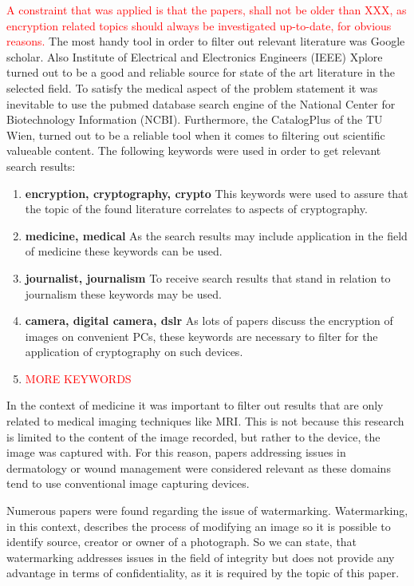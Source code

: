 \documentclass[12pt,a4paper,titlepage,oneside]{scrartcl}
\newcommand\todo[1]{\textcolor{red}{#1}}
\begin{document}
\todo{A constraint that was applied is that the papers, shall not be older than XXX, as encryption related topics should always be investigated up-to-date, for obvious reasons.}
The most handy tool in order to filter out relevant literature was Google scholar. 
Also Institute of Electrical and Electronics Engineers (IEEE) Xplore turned out to be a good and reliable source for state of the art literature in the selected field.
To satisfy the medical aspect of the problem statement it was inevitable to use the pubmed database search engine of the National Center for Biotechnology Information (NCBI).
Furthermore, the CatalogPlus of the TU Wien, turned out to be a reliable tool when it comes to filtering out scientific valueable content.
The following keywords were used in order to get relevant search results:
\begin{enumerate}
  \item  \textbf{encryption, cryptography, crypto}
  This keywords were used to assure that the topic of the found literature correlates to aspects of cryptography.
  \item  \textbf{medicine, medical}
  As the search results may include application in the field of medicine these keywords can be used.
  \item  \textbf{journalist, journalism}
  To receive search results that stand in relation to journalism these keywords may be used.
  \item \textbf{camera, digital camera, dslr}
  As lots of papers discuss the encryption of images on convenient PCs, these keywords are necessary to filter for the application of cryptography on such devices.
\item \todo{MORE KEYWORDS}
\end{enumerate}

In the context of medicine it was important to filter out results that are only related to medical imaging techniques like MRI.
This is not because this research is limited to the content of the image recorded, but rather to the device, the image was captured with.
For this reason, papers addressing issues in dermatology or wound management were considered relevant as these domains tend to use conventional image capturing devices.

Numerous papers were found regarding the issue of watermarking.
Watermarking, in this context, describes the process of modifying an image so it is possible to identify source, creator or owner of a photograph.
So we can state, that watermarking addresses issues in the field of integrity but does not provide any advantage in terms of confidentiality, as it is required by the topic of this paper.
\end{document}
